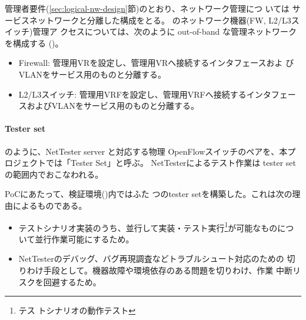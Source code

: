 管理者要件(\ref{sec:logical-nw-design}節)のとおり、ネットワーク管理につ
いては \yo サービスネットワークと分離した構成をとる。
のネットワーク機器(FW, L2/L3スイッチ)管理ア
クセスについては、次のように out-of-band な管理ネットワークを構成する
()。
\begin{itemize}
 \item Firewall: 管理用VRを設定し、管理用VRへ接続するインタフェースおよ
       びVLANをサービス用のものと分離する。
 \item L2/L3スイッチ: 管理用VRFを設定し、管理用VRFへ接続するインタフェー
       スおよびVLANをサービス用のものと分離する。
\end{itemize}

    \paragraph{Tester set}
のように、NetTester server と対応する物理
OpenFlowスイッチのペアを、本プロジェクトでは「Tester Set」と呼ぶ。
NetTesterによるテスト作業は tester set の範囲内でおこなわれる。

PoCにあたって、検証環境()内ではふた
つのtester setを構築した。これは次の理由によるものである。
\begin{itemize}
 \item テストシナリオ実装のうち、並行して実装・テスト実行\footnote{テス
       トシナリオの動作テスト}が可能なものについて並行作業可能にするため。
 \item NetTesterのデバッグ、バグ再現調査などトラブルシュート対応のための
       切りわけ手段として。機器故障や環境依存のある問題を切りわけ、作業
       中断リスクを回避するため。
\end{itemize}

